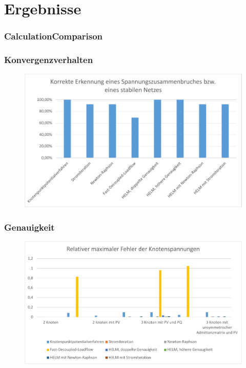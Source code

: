 \documentclass[hyperref={pdfpagelabels=false},compress]{beamer}
\begin{document}
\section{Ergebnisse}

\begin{frame}
	\frametitle{CalculationComparison}
\end{frame}

\begin{frame}
	\frametitle{Konvergenzverhalten}	
	\begin{figure}
		\centering
		\includegraphics[scale=0.6]{pictures/convergence}
	\end{figure}
\end{frame}

\begin{frame}
	\frametitle{Genauigkeit}
	\begin{figure}
		\centering
		\includegraphics[scale=0.6]{pictures/precision_1}
	\end{figure}
\end{frame}
\end{document}
